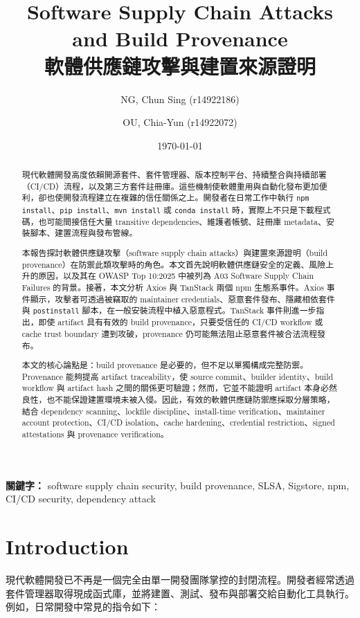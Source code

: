 \documentclass[12pt,a4paper]{article}
\title{\bfseries Software Supply Chain Attacks and Build Provenance\\
\large 軟體供應鏈攻擊與建置來源證明}
\author{NG, Chun Sing (r14922186) \and OU, Chia-Yun (r14922072)}
\date{\today}
\begin{document}
\maketitle

\begin{abstract}
現代軟體開發高度依賴開源套件、套件管理器、版本控制平台、持續整合與持續部署（CI/CD）流程，以及第三方套件註冊庫。這些機制使軟體重用與自動化發布更加便利，卻也使開發流程建立在複雜的信任關係之上。開發者在日常工作中執行 \texttt{npm install}、\texttt{pip install}、\texttt{mvn install} 或 \texttt{conda install} 時，實際上不只是下載程式碼，也可能間接信任大量 transitive dependencies、維護者帳號、註冊庫 metadata、安裝腳本、建置流程與發布管線。

本報告探討軟體供應鏈攻擊（software supply chain attacks）與建置來源證明（build provenance）在防禦此類攻擊時的角色。本文首先說明軟體供應鏈安全的定義、風險上升的原因，以及其在 OWASP Top 10:2025 中被列為 A03 Software Supply Chain Failures 的背景。接著，本文分析 Axios 與 TanStack 兩個 npm 生態系事件。Axios 事件顯示，攻擊者可透過被竊取的 maintainer credentials、惡意套件發布、隱藏相依套件與 \texttt{postinstall} 腳本，在一般安裝流程中植入惡意程式。TanStack 事件則進一步指出，即使 artifact 具有有效的 build provenance，只要受信任的 CI/CD workflow 或 cache trust boundary 遭到攻破，provenance 仍可能無法阻止惡意套件被合法流程發布。

本文的核心論點是：build provenance 是必要的，但不足以單獨構成完整防禦。Provenance 能夠提高 artifact traceability，使 source commit、builder identity、build workflow 與 artifact hash 之間的關係更可驗證；然而，它並不能證明 artifact 本身必然良性，也不能保證建置環境未被入侵。因此，有效的軟體供應鏈防禦應採取分層策略，結合 dependency scanning、lockfile discipline、install-time verification、maintainer account protection、CI/CD isolation、cache hardening、credential restriction、signed attestations 與 provenance verification。
\end{abstract}

\noindent\textbf{關鍵字：} software supply chain security, build provenance, SLSA, Sigstore, npm, CI/CD security, dependency attack

\newpage
\tableofcontents
\newpage

\section{Introduction}

現代軟體開發已不再是一個完全由單一開發團隊掌控的封閉流程。開發者經常透過套件管理器取得現成函式庫，並將建置、測試、發布與部署交給自動化工具執行。例如，日常開發中常見的指令如下：
\end{document}

